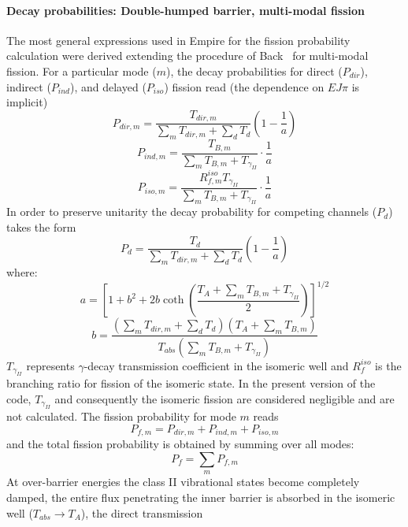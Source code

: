 \documentclass[twocolumn,amsmath,amssymb,10pt,groupedaddress,a4paper]{revtex4}
\begin{document}
\paragraph{Decay probabilities: Double-humped barrier, multi-modal fission}
The most general expressions used in Empire for the fission probability
calculation were derived extending the procedure of Back~\cite{Back:74}
for multi-modal fission. For a particular mode ($m$), the decay probabilities
for direct ($P_{dir}$), indirect ($P_{ind}$), and delayed ($P_{iso}$)
fission read (the dependence on $EJ\pi$ is implicit)
\begin{equation}
P_{dir,m}=\frac{T_{dir,m}}{\sum_{m}T_{dir,m}+\sum_{d}T_{d}}\left(1-\frac{1}{a}\right)
\end{equation}
\begin{equation}
P_{ind,m}=\frac{T_{B,m}}{\sum_{m}T_{B,m}+T_{\gamma_{II}}}\cdot\frac{1}{a}
\end{equation}
\begin{equation}
P_{iso,m}=\frac{R_{f,m}^{iso}T_{\gamma_{II}}}{\sum_{m}T_{B,m}+T_{\gamma_{II}}}\cdot\frac{1}{a}
\end{equation}
 In order to preserve unitarity the decay probability for competing
channels ($P_{d}$) takes the form
\begin{equation}
P_{d}=\frac{T_{d}}{\sum_{m}T_{dir,m}+\sum_{d}T_{d}}\left(1-\frac{1}{a}\right)
\end{equation}
\noindent where: \[
a=\left[1+b^{2}+2b\coth\left(\frac{T_{A}+\sum_{m}T_{B,m}+T_{\gamma_{II}}}{2}\right)\right]^{1/2}\]
 \[
b=\frac{(\sum_{m}T_{dir,m}+\sum_{d}T_{d})(T_{A}+\sum_{m}T_{B,m})}{T_{abs}(\sum_{m}T_{B,m}+T_{\gamma_{II}})}\]
 $T_{\gamma_{II}}$ represents $\gamma$-decay transmission coefficient
in the isomeric well and $R_{f}^{iso}$ is the branching ratio for
fission of the isomeric state. In the present version of the code,
$T_{\gamma_{II}}$ and consequently the isomeric
fission are considered negligible and are not calculated. The fission
probability for mode $m$ reads
\begin{equation}
P_{f,m}=P_{dir,m}+P_{ind,m}+P_{iso,m}
\end{equation}
 and the total fission probability is obtained by summing over all
modes:
\begin{equation}
P_{f}=\sum_{m}P_{f,m}
\end{equation}
 At over-barrier energies the class II vibrational states become completely
damped, the entire flux penetrating the inner barrier is absorbed
in the isomeric well ($T_{abs}\rightarrow T_{A}$), the direct transmission
\end{document}
